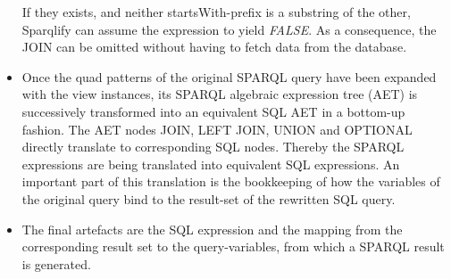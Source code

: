 \documentclass[a4paper,twoside,bibtotoc,abstracton,12pt,BCOR=15mm]{scrreprt}
\newcommand{\todo}[1]{\textbf{ToDo: \textit{#1}}}
\begin{document}
\begin{itemize}
		If they exists, and neither startsWith-prefix is a substring of the other, Sparqlify can assume the expression to yield \emph{FALSE}. 
		As a consequence, the JOIN can be omitted without having to fetch data from the database.
    
  \item Once the quad patterns of the original SPARQL query have been expanded with the view instances, its SPARQL algebraic expression tree (AET) is successively transformed
		into an equivalent SQL AET in a bottom-up fashion.
		The AET nodes JOIN, LEFT JOIN, UNION and OPTIONAL directly translate to corresponding SQL nodes.
		Thereby the SPARQL expressions are being translated into equivalent SQL expressions. An important part of this translation is the bookkeeping of how
		the variables of the original query bind to the result-set of the rewritten SQL query.
  \item The final artefacts are the SQL expression and the mapping from the corresponding result set to the query-variables, from which a SPARQL result is generated.
\end{itemize}
\end{document}
